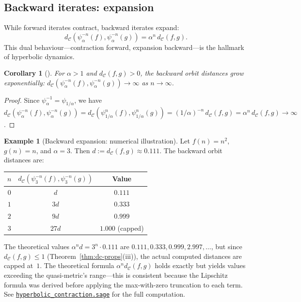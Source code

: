 \documentclass[11pt,a4paper]{article}
\newcommand{\repourl}{https://github.com/guydev42/expansive-homeomorphisms-complexity-qmetric}
\theoremstyle{plain}
\newtheorem{corollaryinner}[theoreminner]{Corollary}
\theoremstyle{definition}
\newtheorem{exampleinner}[theoreminner]{Example}
\newenvironment{corollary}[1][]{\begin{corollaryinner}[#1]}{\end{corollaryinner}}
\newenvironment{example}[1][]{\begin{exampleinner}[#1]}{\end{exampleinner}}
\newcommand{\C}{\mathcal{C}}
\begin{document}
\subsection{Backward iterates: expansion}

While forward iterates contract, backward iterates expand:
\[
  d_\C(\psi_\alpha^{-n}(f),\psi_\alpha^{-n}(g))
  = \alpha^n\,d_\C(f,g).
\]
This dual behaviour---contraction forward, expansion backward---is
the hallmark of hyperbolic dynamics.

\begin{corollary}\label{cor:backward-expansion}
For $\alpha>1$ and $d_\C(f,g)>0$, the backward orbit distances
grow exponentially:
$d_\C(\psi_\alpha^{-n}(f),\psi_\alpha^{-n}(g))\to\infty$ as
$n\to\infty$.
\end{corollary}

\begin{proof}
Since $\psi_\alpha^{-1}=\psi_{1/\alpha}$, we have
$d_\C(\psi_\alpha^{-n}(f),\psi_\alpha^{-n}(g))
=d_\C(\psi_{1/\alpha}^n(f),\psi_{1/\alpha}^n(g))
=(1/\alpha)^{-n}\,d_\C(f,g)=\alpha^n\,d_\C(f,g)\to\infty$.
\end{proof}

\begin{example}[Backward expansion: numerical illustration]\label{ex:backward-num}
Let $f(n)=n^2$, $g(n)=n$, and $\alpha=3$.  Then
$d:=d_\C(f,g)\approx 0.111$.  The backward orbit distances are:
\begin{center}
\begin{tabular}{ccc}
\hline
$n$ & $d_\C(\psi_3^{-n}(f),\psi_3^{-n}(g))$ & Value \\\hline
$0$ & $d$ & $0.111$ \\
$1$ & $3d$ & $0.333$ \\
$2$ & $9d$ & $0.999$ \\
$3$ & $27d$ & $1.000$ (capped)\\
\hline
\end{tabular}
\end{center}
The theoretical values $\alpha^n d = 3^n \cdot 0.111$ are
$0.111, 0.333, 0.999, 2.997, \ldots$, but since
$d_\C(f,g)\le 1$ (Theorem~\ref{thm:dc-props}(iii)), the actual
computed distances are capped at~$1$.  The theoretical formula
$\alpha^n d_\C(f,g)$ holds exactly but yields values exceeding
the quasi-metric's range---this is consistent because the
Lipschitz formula was derived before applying the max-with-zero
truncation to each term.
See
\href{\repourl/blob/main/code/sagemath/hyperbolic_contraction.sage}{\texttt{hyperbolic\_contraction.sage}}
for the full computation.
\end{example}
\end{document}
